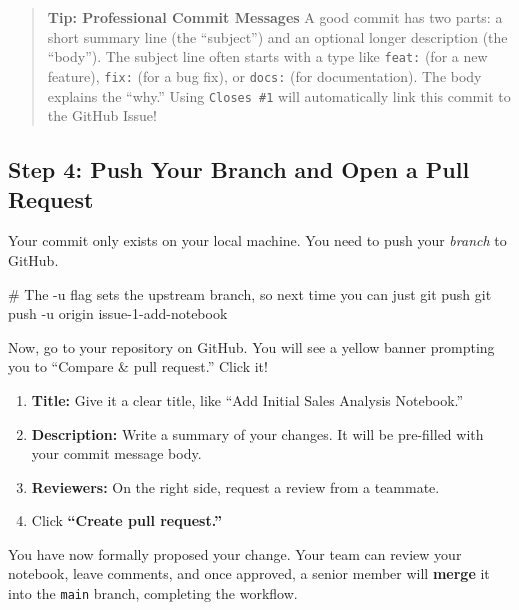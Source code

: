 \documentclass[
  letterpaper,
  DIV=11,
  numbers=noendperiod]{scrreprt}
\newenvironment{Shaded}{\begin{snugshade}}{\end{snugshade}}
\newcommand{\AttributeTok}[1]{\textcolor[rgb]{0.40,0.45,0.13}{#1}}
\newcommand{\CommentTok}[1]{\textcolor[rgb]{0.37,0.37,0.37}{#1}}
\newcommand{\FunctionTok}[1]{\textcolor[rgb]{0.28,0.35,0.67}{#1}}
\newcommand{\NormalTok}[1]{\textcolor[rgb]{0.00,0.23,0.31}{#1}}
\providecommand{\tightlist}{%
  \setlength{\itemsep}{0pt}\setlength{\parskip}{0pt}}
\begin{document}
\begin{quote}
\textbf{Tip: Professional Commit Messages} A good commit has two parts:
a short summary line (the ``subject'') and an optional longer
description (the ``body''). The subject line often starts with a type
like \texttt{feat:} (for a new feature), \texttt{fix:} (for a bug fix),
or \texttt{docs:} (for documentation). The body explains the ``why.''
Using \texttt{Closes\ \#1} will automatically link this commit to the
GitHub Issue!
\end{quote}

\subsection{Step 4: Push Your Branch and Open a Pull
Request}\label{step-4-push-your-branch-and-open-a-pull-request}

Your commit only exists on your local machine. You need to push your
\emph{branch} to GitHub.

\begin{Shaded}
\begin{Highlighting}[]
\CommentTok{\# The {-}u flag sets the upstream branch, so next time you can just \textquotesingle{}git push\textquotesingle{}}
\FunctionTok{git}\NormalTok{ push }\AttributeTok{{-}u}\NormalTok{ origin issue{-}1{-}add{-}notebook}
\end{Highlighting}
\end{Shaded}

Now, go to your repository on GitHub. You will see a yellow banner
prompting you to ``Compare \& pull request.'' Click it!

\begin{enumerate}
\def\labelenumi{\arabic{enumi}.}
\tightlist
\item
  \textbf{Title:} Give it a clear title, like ``Add Initial Sales
  Analysis Notebook.''
\item
  \textbf{Description:} Write a summary of your changes. It will be
  pre-filled with your commit message body.
\item
  \textbf{Reviewers:} On the right side, request a review from a
  teammate.
\item
  Click \textbf{``Create pull request.''}
\end{enumerate}

You have now formally proposed your change. Your team can review your
notebook, leave comments, and once approved, a senior member will
\textbf{merge} it into the \texttt{main} branch, completing the
workflow.
\end{document}
